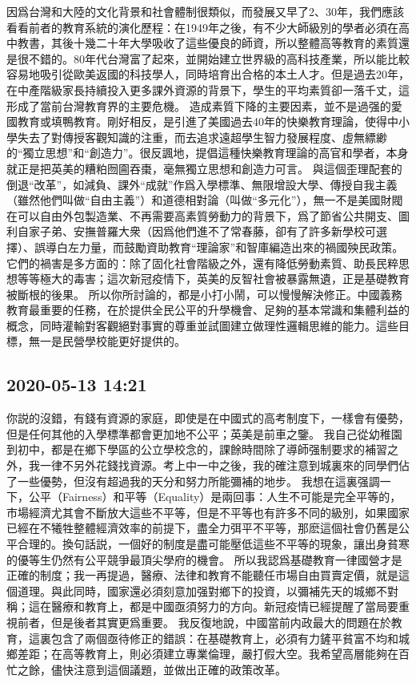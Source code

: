 \documentclass[twocolumn]{ctexart}
\begin{document}
因爲台灣和大陸的文化背景和社會體制很類似，而發展又早了2、30年，我們應該看看前者的教育系統的演化歷程：在1949年之後，有不少大師級別的學者必須在高中教書，其後十幾二十年大學吸收了這些優良的師資，所以整體高等教育的素質還是很不錯的。80年代台灣富了起來，並開始建立世界級的高科技產業，所以能比較容易地吸引從歐美返國的科技學人，同時培育出合格的本土人才。但是過去20年，在中產階級家長持續投入更多課外資源的背景下，學生的平均素質卻一落千丈，這形成了當前台灣教育界的主要危機。 
造成素質下降的主要因素，並不是過强的愛國教育或填鴨教育。剛好相反，是引進了美國過去40年的快樂教育理論，使得中小學失去了對傳授客觀知識的注重，而去追求遠超學生智力發展程度、虛無縹緲的“獨立思想”和“創造力”。很反諷地，提倡這種快樂教育理論的高官和學者，本身就正是把英美的糟粕囫圇吞棗，毫無獨立思想和創造力可言。 
與這個歪理配套的倒退“改革”，如減負、課外“成就”作爲入學標準、無限增設大學、傳授自我主義（雖然他們叫做“自由主義”）和道德相對論（叫做“多元化”），無一不是美國財閥在可以自由外包製造業、不再需要高素質勞動力的背景下，爲了節省公共開支、圖利自家子弟、安撫普羅大衆（因爲他們進不了常春藤，卻有了許多新學校可選擇）、誤導白左力量，而鼓勵資助教育“理論家”和智庫編造出來的禍國殃民政策。它們的禍害是多方面的：除了固化社會階級之外，還有降低勞動素質、助長民粹思想等等極大的毒害；這次新冠疫情下，英美的反智社會被暴露無遺，正是基礎教育被斷根的後果。 
所以你所討論的，都是小打小鬧，可以慢慢解決修正。中國義務教育最重要的任務，在於提供全民公平的升學機會、足夠的基本常識和集體利益的概念，同時灌輸對客觀絕對事實的尊重並試圖建立做理性邏輯思維的能力。這些目標，無一是民營學校能更好提供的。
\subsection*{2020-05-13 14:21}

你説的沒錯，有錢有資源的家庭，即使是在中國式的高考制度下，一樣會有優勢，但是任何其他的入學標準都會更加地不公平；英美是前車之鑒。 
我自己從幼稚園到初中，都是在鄉下學區的公立學校念的，課餘時間除了導師强制要求的補習之外，我一律不另外花錢找資源。考上中一中之後，我的確注意到城裏來的同學們佔了一些優勢，但沒有超過我的天分和努力所能彌補的地步。 
我想在這裏强調一下，公平（Fairness）和平等（Equality）是兩回事：人生不可能是完全平等的，市場經濟尤其會不斷放大這些不平等，但是不平等也有許多不同的級別，如果國家已經在不犧牲整體經濟效率的前提下，盡全力弭平不平等，那麽這個社會仍舊是公平合理的。換句話説，一個好的制度是盡可能壓低這些不平等的現象，讓出身貧寒的優等生仍然有公平競爭最頂尖學府的機會。 
所以我認爲基礎教育一律國營才是正確的制度；我一再提過，醫療、法律和教育不能聽任市場自由買賣定價，就是這個道理。與此同時，國家還必須刻意加强對鄉下的投資，以彌補先天的城鄉不對稱；這在醫療和教育上，都是中國亟須努力的方向。新冠疫情已經提醒了當局要重視前者，但是後者其實更爲重要。 
我反復地說，中國當前内政最大的問題在於教育，這裏包含了兩個亟待修正的錯誤：在基礎教育上，必須有力鏟平貧富不均和城鄉差距；在高等教育上，則必須建立專業倫理，嚴打假大空。我希望高層能夠在百忙之餘，儘快注意到這個議題，並做出正確的政策改革。
\end{document}
